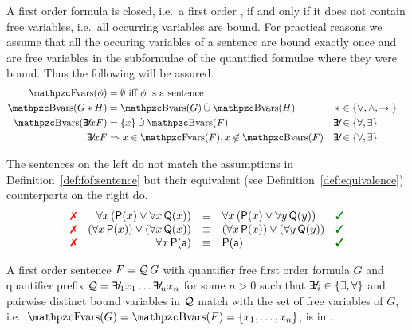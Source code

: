 \begin{definition}\label{def:fof:closed}\label{def:fof:sentence}
	A first order formula is closed, i.e.~a first order ,
	if and only if it does not contain free variables, 
	i.e.~all occurring variables are bound.
	For practical reasons we assume that all the occuring variables of a sentence
	are bound exactly once
	and are free variables
	in the subformulae of the quantified formulae where they were bound.
	Thus the following will be assured.
	\begin{align*}
		\fvar(\phi) &= \emptyset
		\text{ iff }\phi\text{ is a sentence}
		\\
		\bvar(G \connect H) &= \bvar(G)\disjointunion\bvar(H)
		&\connect& \in \SetOfConnectives
		\\
		\bvar(\quantify x F) &= \{x\}\disjointunion\bvar(F)
		&\quantify& \in \SetOfQuantifiers
		\\
		\quantify x F &\Rightarrow
		x\in\fvar(F), x\not\in\bvar(F)
		&\quantify& \in \SetOfQuantifiers
	\end{align*}
\end{definition}

\begin{example}The sentences on the left do not match
	the assumptions in Definition~\vref{def:fof:sentence}
	but their {equivalent (see Definition~\vref{def:equivalence})}
	counterparts on the right do.
	\[
	\begin{array}{rrcll}
		 \text{\color{colLo}{\xmark}}
		& \forall x\, ({\mP(x) \lor \forall x\, {\mQ(x)}})
		& {\equiv}
		& \forall x\, ({\mP(x) \lor \forall y\, {\mQ(y)}})
		& \text{\color{colHi}{\cmark}}
		\\ \text{\color{colLo}{\xmark}}
		& (\forall x\, {\mP(x)}) \lor (\forall x\, {\mQ(x)})
		& {\equiv}
		& (\forall x\, {\mP(x)}) \lor (\forall y\, {\mQ(y)})
		& \text{\color{colHi}{\cmark}}
		\\
		\text{\color{colLo}{\xmark}}
		&  \forall x\, {\mP(\ma)}
		& {\equiv}
		& \mP(\ma)
		& \text{\color{colHi}{\cmark}}
	\end{array}
	\]

\end{example}

\begin{definition}\label{def:prenex:normal:form}
	A first order sentence 
	\( F = \mathcal{Q}\,G \)
	with 
	quantifier free first order formula \( G \)
	and
	quantifier prefix \( \mathcal{Q} = \quantify_1 x_1 \ldots \quantify_n x_n \)
	for some \( n > 0 \)
	such that
	\( \quantify_i \in \{ \exists, \forall \} \) 
	and pairwise distinct bound variables
	in \(\mathcal{Q}\)
	match with the set of free variables of \(G\), 
	i.e.~\( \fvar(G) = \bvar(F) = \{ x_1,\ldots,x_n \} \),
	is in .
\end{definition}

